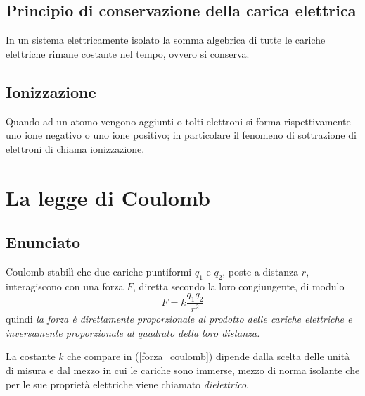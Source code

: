 \documentclass[class=book, crop=false, oneside, 12pt]{standalone}
\begin{document}
\subsection{Principio di conservazione della carica elettrica}

In un sistema elettricamente isolato la somma algebrica di tutte le cariche elettriche rimane costante nel tempo, ovvero si conserva. 

\subsection{Ionizzazione}

Quando ad un atomo vengono aggiunti o tolti elettroni si forma rispettivamente uno ione negativo o uno ione positivo; in particolare il fenomeno di sottrazione di elettroni di chiama ionizzazione.

\section{La legge di Coulomb}

\subsection{Enunciato}

Coulomb stabilì che due cariche puntiformi \(q_1\) e \(q_2\), poste a distanza \(r\), interagiscono con una forza \(F\), diretta secondo la loro congiungente, di modulo
\begin{equation} \label{forza_coulomb}
    F = k \frac{q_1 q_2}{r^2}
\end{equation}
quindi \emph{la forza è direttamente proporzionale al prodotto delle cariche elettriche e inversamente proporzionale al quadrato della loro distanza.}

La costante \(k\) che compare in (\ref{forza_coulomb}) dipende dalla scelta delle unità di misura e dal mezzo in cui le cariche sono immerse, mezzo di norma isolante che per le sue proprietà elettriche viene chiamato \emph{dielettrico}. 
\end{document}
